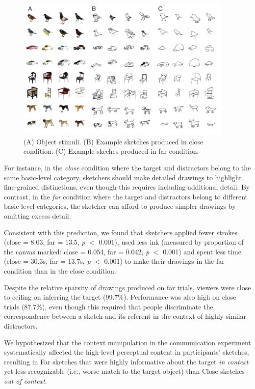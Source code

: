 \documentclass[9pt,twocolumn,twoside]{pnas-new}
\begin{document}
\begin{figure}[htbp]
\centering
\includegraphics[width=0.95\textwidth]{figures/2_sketch_gallery.pdf}
\caption{(A) Object stimuli. (B) Example sketches produced in close condition. (C) Example skeches produced in far condition.}
\label{sketch_gallery}
\end{figure}


For instance, in the \textit{close} condition where the target and distractors belong to the same basic-level category, sketchers should make detailed drawings to highlight fine-grained distinctions, even though this requires including additional detail. By contrast, in the \textit{far} condition where the target and distractors belong to different basic-level categories, the sketcher can afford to produce simpler drawings by omitting excess detail.

Consistent with this prediction, we found that sketchers applied fewer strokes (close = 8.03, far = 13.5, \textit{p} $<$ 0.001), used less ink (measured by proportion of the canvas marked: close = 0.054, far = 0.042, \textit{p} $<$ 0.001) and spent less time (close = 30.3s, far = 13.7s, \textit{p} $<$ 0.001) to make their drawings in the far condition than in the close condition.

Despite the relative sparsity of drawings produced on far trials, viewers were close to ceiling on inferring the target (99.7\%). Performance was also high on close trials (87.7\%), even though this required that people discriminate the correspondence between a sketch and its referent in the context of highly similar distractors.

We hypothesized that the context manipulation in the communication experiment systematically affected the high-level perceptual content in participants' sketches, resulting in Far sketches that were highly informative about the target \textit{in context} yet less recognizable (i.e., worse match to the target object) than Close sketches \textit{out of context}.
\end{document}
